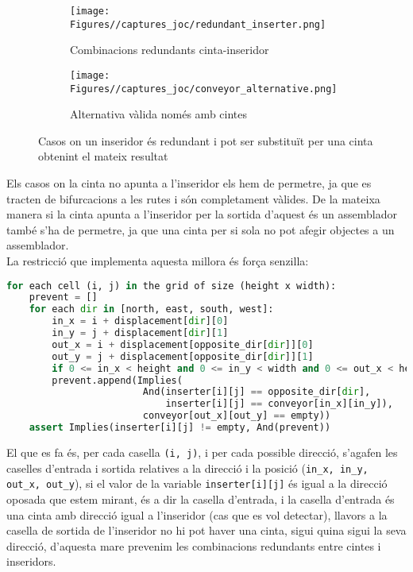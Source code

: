 \begin{figure}[H]
    \centering
    \begin{subfigure}{0.45\textwidth}
        \texttt{[image: Figures//captures\_joc/redundant\_inserter.png]}
        \caption{Combinacions redundants cinta-inseridor}
    \end{subfigure}
    \hfill
    \begin{subfigure}{0.45\textwidth}
        \texttt{[image: Figures//captures\_joc/conveyor\_alternative.png]}
        \caption{Alternativa vàlida només amb cintes}
    \end{subfigure}
    \caption{Casos on un inseridor és redundant i pot ser substituït per una cinta obtenint el mateix resultat}
    \label{fig:redundant_inserter}
\end{figure}

Els casos on la cinta no apunta a l'inseridor els hem de permetre, ja que es tracten de bifurcacions a les rutes i són completament vàlides. De la mateixa manera si la cinta apunta a l'inseridor per la sortida d'aquest és un assemblador també s'ha de permetre, ja que una cinta per si sola no pot afegir objectes a un assemblador.\\

La restricció que implementa aquesta millora és força senzilla:

\begin{lstlisting}[language=Python, caption=Evitar inserdiors redundants]
for each cell (i, j) in the grid of size (height x width):
    prevent = []
    for each dir in [north, east, south, west]:
        in_x = i + displacement[dir][0]
        in_y = j + displacement[dir][1]
        out_x = i + displacement[opposite_dir[dir]][0]
        out_y = j + displacement[opposite_dir[dir]][1]
        if 0 <= in_x < height and 0 <= in_y < width and 0 <= out_x < height and 0 <= out_y < width:
        prevent.append(Implies(
                        And(inserter[i][j] == opposite_dir[dir],
                            inserter[i][j] == conveyor[in_x][in_y]),
                        conveyor[out_x][out_y] == empty))
    assert Implies(inserter[i][j] != empty, And(prevent))
\end{lstlisting}

El que es fa és, per cada casella \lstinline{(i, j)}, i per cada possible direcció, s'agafen les caselles d'entrada i sortida relatives a la direcció i la posició (\lstinline{in_x, in_y, out_x, out_y}), si el valor de la variable \lstinline{inserter[i][j]} és igual a la direcció oposada que estem mirant, és a dir la casella d'entrada, i la casella d'entrada és una cinta amb direcció igual a l'inseridor (cas que es vol detectar), llavors a la casella de sortida de l'inseridor no hi pot haver una cinta, sigui quina sigui la seva direcció, d'aquesta mare prevenim les combinacions redundants entre cintes i inseridors.

